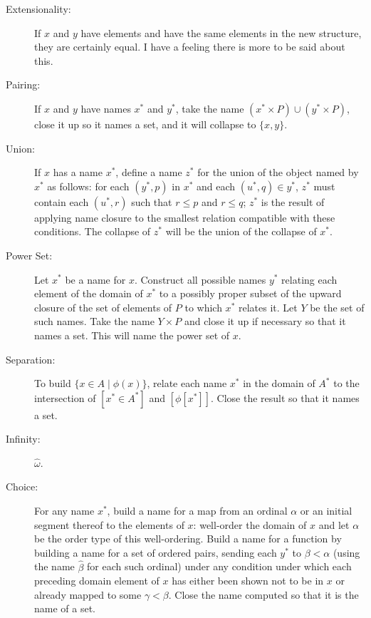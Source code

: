 \documentclass[12pt]{book}
\begin{document}
\begin{description}

\item[Extensionality:]  If $x$ and $y$ have elements and have the same elements in the new structure, they are certainly equal.  I have a feeling there is more to be said about this.

\item[Pairing:] If $x$ and $y$ have names $x^*$ and $y^*$, take the name $(x^* \times P) \cup (y^* \times P)$, close it up so it names a set, and it will collapse to $\{x,y\}$.

\item[Union:]  If $x$ has a name $x^*$, define a name $z^*$ for the union of the object named by $x^*$ as follows:  for each $(y^*,p)$ in $x^*$
and each $(u^*,q) \in y^*$, $z^*$ must contain each $(u^*,r)$ such that $r \leq p$ and $r \leq q$;  $z^*$ is the result of applying name closure to the smallest relation compatible with these conditions.  The collapse of $z^*$ will be the union of the collapse of $x^*$.

\item[Power Set:]  Let $x^*$ be a name for $x$.  Construct all possible  names $y^*$ relating each element of the domain of $x^*$ to a possibly proper subset of the upward closure of the set of elements of $P$ to which $x^*$ relates it.  Let $Y$ be the set of such names.  Take the name $Y \times P$ and close it up if necessary so that it names a set.  This will name the power set of $x$.

\item[Separation:]  To build $\{x \in A \mid \phi(x)\}$,  relate each name $x^*$ in the domain of $A^*$ to the intersection of $[x^* \in A^*]$ and $[\phi[x^*]]$.  Close the result so that it names a set. 

\item[Infinity:]  $\hat{\omega}$.

\item[Choice:]  For any name $x^*$, build a name for a map from an ordinal $\alpha$ or an initial segment thereof to the elements of $x$:  well-order the domain of $x$ and let $\alpha$ be the order type of this well-ordering.  Build a name for a function by building a name for a set of ordered pairs, sending each $y^*$ to $\beta<\alpha$ (using the name $\hat{\beta}$ for each such ordinal) under any condition under which each preceding domain element of $x$ has either been shown not to be in $x$ or already mapped to some $\gamma<\beta$.   Close the name computed so that it is the name of a set.


\end{description}
\end{document}
